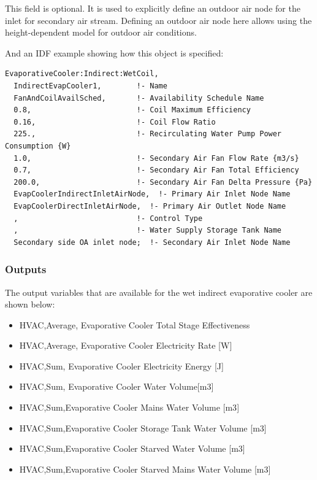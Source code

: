 This field is optional. It is used to explicitly define an outdoor air node for the inlet for secondary air stream. Defining an outdoor air node here allows using the height-dependent model for outdoor air conditions.

And an IDF example showing how this object is specified:

\begin{lstlisting}
EvaporativeCooler:Indirect:WetCoil,
  IndirectEvapCooler1,        !- Name
  FanAndCoilAvailSched,       !- Availability Schedule Name
  0.8,                        !- Coil Maximum Efficiency
  0.16,                       !- Coil Flow Ratio
  225.,                       !- Recirculating Water Pump Power Consumption {W}
  1.0,                        !- Secondary Air Fan Flow Rate {m3/s}
  0.7,                        !- Secondary Air Fan Total Efficiency
  200.0,                      !- Secondary Air Fan Delta Pressure {Pa}
  EvapCoolerIndirectInletAirNode,  !- Primary Air Inlet Node Name
  EvapCoolerDirectInletAirNode,  !- Primary Air Outlet Node Name
  ,                           !- Control Type
  ,                           !- Water Supply Storage Tank Name
  Secondary side OA inlet node;  !- Secondary Air Inlet Node Name
\end{lstlisting}

\subsubsection{Outputs}\label{outputs-3-006}

The output variables that are available for the wet indirect evaporative cooler are shown below:

\begin{itemize}
\item
  HVAC,Average, Evaporative Cooler Total Stage Effectiveness
\item
  HVAC,Average, Evaporative Cooler Electricity Rate {[}W{]}
\item
  HVAC,Sum, Evaporative Cooler Electricity Energy {[}J{]}
\item
  HVAC,Sum, Evaporative Cooler Water Volume{[}m3{]}
\item
  HVAC,Sum,Evaporative Cooler Mains Water Volume {[}m3{]}
\item
  HVAC,Sum,Evaporative Cooler Storage Tank Water Volume {[}m3{]}
\item
  HVAC,Sum,Evaporative Cooler Starved Water Volume {[}m3{]}
\item
  HVAC,Sum,Evaporative Cooler Starved Mains Water Volume {[}m3{]}
\end{itemize}

